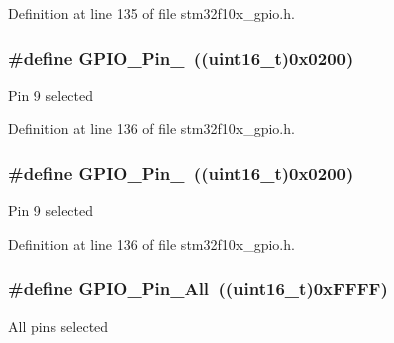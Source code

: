 Definition at line 135 of file stm32f10x\+\_\+gpio.\+h.

\subsubsection[{\texorpdfstring{G\+P\+I\+O\+\_\+\+Pin\+\_\+9}{GPIO_Pin_9}}]{\setlength{\rightskip}{0pt plus 5cm}\#define G\+P\+I\+O\+\_\+\+Pin\+\_~(({\bf uint16\+\_\+t})0x0200)}\hypertarget{group___g_p_i_o__pins__define_gaad1891082d5d6bcac06c2729a9fdd2f0}{}\label{group___g_p_i_o__pins__define_gaad1891082d5d6bcac06c2729a9fdd2f0}
Pin 9 selected 

Definition at line 136 of file stm32f10x\+\_\+gpio.\+h.

\subsubsection[{\texorpdfstring{G\+P\+I\+O\+\_\+\+Pin\+\_\+9}{GPIO_Pin_9}}]{\setlength{\rightskip}{0pt plus 5cm}\#define G\+P\+I\+O\+\_\+\+Pin\+\_~(({\bf uint16\+\_\+t})0x0200)}\hypertarget{group___g_p_i_o__pins__define_gaad1891082d5d6bcac06c2729a9fdd2f0}{}\label{group___g_p_i_o__pins__define_gaad1891082d5d6bcac06c2729a9fdd2f0}
Pin 9 selected 

Definition at line 136 of file stm32f10x\+\_\+gpio.\+h.

\subsubsection[{\texorpdfstring{G\+P\+I\+O\+\_\+\+Pin\+\_\+\+All}{GPIO_Pin_All}}]{\setlength{\rightskip}{0pt plus 5cm}\#define G\+P\+I\+O\+\_\+\+Pin\+\_\+\+All~(({\bf uint16\+\_\+t})0x\+F\+F\+F\+F)}\hypertarget{group___g_p_i_o__pins__define_gaba3e915ddca17a1211edc07b7fd97e8b}{}\label{group___g_p_i_o__pins__define_gaba3e915ddca17a1211edc07b7fd97e8b}
All pins selected 

